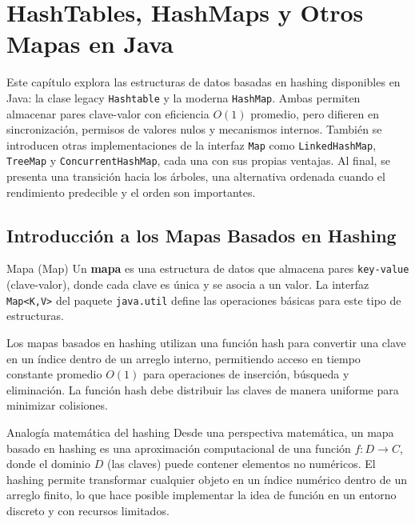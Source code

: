 \chapter{HashTables, HashMaps y Otros Mapas en Java}
\label{ch:hash-tables-maps}

Este capítulo explora las estructuras de datos basadas en hashing disponibles en Java: la clase legacy \texttt{Hashtable} y la moderna \texttt{HashMap}. Ambas permiten almacenar pares clave-valor con eficiencia \(O(1)\) promedio, pero difieren en sincronización, permisos de valores nulos y mecanismos internos. También se introducen otras implementaciones de la interfaz \texttt{Map} como \texttt{LinkedHashMap}, \texttt{TreeMap} y \texttt{ConcurrentHashMap}, cada una con sus propias ventajas. Al final, se presenta una transición hacia los árboles, una alternativa ordenada cuando el rendimiento predecible y el orden son importantes.

\section{Introducción a los Mapas Basados en Hashing}
\label{sec:intro-maps}

\begin{definicion}{Mapa (Map)}
Un \textbf{mapa} es una estructura de datos que almacena pares \texttt{key-value} (clave-valor), donde cada clave es única y se asocia a un valor. La interfaz \texttt{Map<K,V>} del paquete \texttt{java.util} define las operaciones básicas para este tipo de estructuras.
\end{definicion}

Los mapas basados en hashing utilizan una función hash para convertir una clave en un índice dentro de un arreglo interno, permitiendo acceso en tiempo constante promedio \(O(1)\) para operaciones de inserción, búsqueda y eliminación. La función hash debe distribuir las claves de manera uniforme para minimizar colisiones.

\begin{observacion}{Analogía matemática del hashing}
Desde una perspectiva matemática, un mapa basado en hashing es una aproximación computacional de una función \(f: D \to C\), donde el dominio \(D\) (las claves) puede contener elementos no numéricos. El hashing permite transformar cualquier objeto en un índice numérico dentro de un arreglo finito, lo que hace posible implementar la idea de función en un entorno discreto y con recursos limitados.
\end{observacion}

